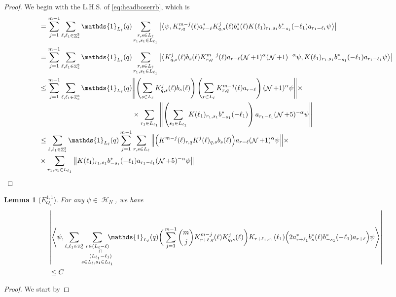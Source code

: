 \documentclass[sn-mathphys, Numbered ,a4paper]{sn-jnl}%
\DeclareMathOperator{\Z}{\mathbb{Z}}
\DeclareMathOperator{\HH}{\mathcal{H}}
\DeclareMathOperator{\NN}{\mathcal{N}}
\newcommand{\eva}[1]{\left\langle #1 \right\rangle}
\theoremstyle{plain}
\newtheorem{lemma}[theorem]{Lemma}
\theoremstyle{definition}
\theoremstyle{remark}
\theoremstyle{plain}
\theoremstyle{definition}
\theoremstyle{remark}
\begin{document}
\begin{proof}
	We begin with the L.H.S. of \eqref{eq:headboserrb}, which is 
	\begin{alignat}{2}
		&= \sum_{j=1}^{m-1}\sum\limits_{\ell,\ell_1 \in \Z^3_*} \mathds{1}_{L_\ell}(q) \sum\limits_{\substack{r,s \in L_{\ell}\\r_1,s_1\in L_{\ell_1}}}  \abs{\eva{\psi, K^{m-j}_{r,q}(\ell)  a^*_{r-\ell} K^{j}_{q,s}(\ell)b^*_{s}(\ell) K(\ell_1)_{r_1,s_1}b^*_{-s_1}(-\ell_1) a_{r_1-\ell_1} \psi }}\nonumber\\
		&= \sum_{j=1}^{m-1}\sum\limits_{\ell,\ell_1 \in \Z^3_*} \mathds{1}_{L_\ell}(q) \sum\limits_{\substack{r,s \in L_{\ell}\\r_1,s_1\in L_{\ell_1}}}  \abs{\eva{ K^{j}_{q,s}(\ell)b_{s}(\ell)  K^{m-j}_{r,q}(\ell)a_{r-\ell}(\NN+1)^{\alpha}(\NN+1)^{-\alpha}\psi,  K(\ell_1)_{r_1,s_1}b^*_{-s_1}(-\ell_1) a_{r_1-\ell_1} \psi }}\nonumber\\
		&\leq \sum_{j=1}^{m-1} \sum\limits_{\ell,\ell_1 \in \Z^3_*} \mathds{1}_{L_\ell}(q) 
		\begin{aligned}[t]
			&  \norm{ \left(\sum\limits_{s \in L_{\ell}}K^{j}_{q,s}(\ell)b_{s}(\ell)\right) \left(\sum\limits_{r \in L_{\ell}}K^{m-j}_{r,q}(\ell)a_{r-\ell}\right)(\NN+1)^{\alpha}\psi}\times\nonumber\\&\times
			\sum\limits_{r_1\in L_{\ell_1}}\norm{ \left(\sum\limits_{s_1\in L_{\ell_1}}K(\ell_1)_{r_1,s_1} b^*_{-s_1}(-\ell_1)\right) a_{r_1-\ell_1} (\NN+5)^{-\alpha} \psi }\nonumber\\    
		\end{aligned}\nonumber\\
		&\leq \sum\limits_{\ell,\ell_1 \in \Z^3_*}  \mathds{1}_{L_\ell}(q) \sum_{j=1}^{m-1} \sum\limits_{r,s \in L_{\ell}}  \norm{  \Big(K^{m-j}(\ell)_{r,q}K^{j}(\ell)_{q,s}b_{s}(\ell)\Big) a_{r-\ell}(\NN+1)^{\alpha}\psi}\times\nonumber\\&\times\sum\limits_{r_1,s_1\in L_{\ell_1}}\norm{
			K(\ell_1)_{r_1,s_1}b^*_{-s_1}(-\ell_1) a_{r_1-\ell_1} (\NN+5)^{-\alpha}\psi }\nonumber\\
	\end{alignat}
\end{proof}

\begin{lemma}[$E_{Q_1}^{4,1}$]
	For any $\psi \in \HH_N$, we have
	\begin{align}
		&\abs{\eva{\psi, \sum\limits_{\ell, \ell_1\in \Z^3_*}\!\!\! \sum\limits_{ \substack{r \in (L_{\ell}-\ell) \\\phantom{r\in} \cap\\\phantom{r\in}(L_{\ell_1}-\ell_1)\\ s \in L_{\ell},s_1\in L_{\ell_1}}}\!\!\!\!\!\!\mathds{1}_{L_\ell}(q)       \bigg(\sum_{j=1}^{m-1} {{m}\choose j}K^{m-j}_{r+\ell,q}(\ell)          K^{j}_{q,s}(\ell)\bigg) K_{r+\ell_1,s_1}(\ell_1)\Big(     2a^*_{r+\ell_1} b^*_{s}(\ell) b^*_{-s_1}(-\ell_1) a_{r+\ell}\Big)   \psi}}\nonumber\\
		&\leq C
	\end{align}
\end{lemma}
\begin{proof}
	We start by
\end{proof}
\end{document}
